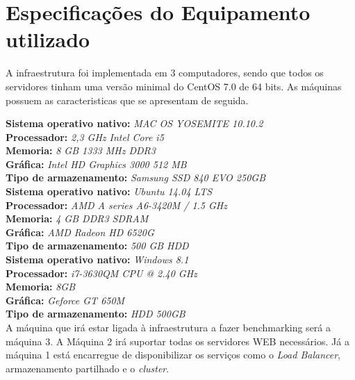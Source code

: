 \section{Especificações do Equipamento utilizado}

A infraestrutura foi implementada em 3 computadores, sendo que todos os servidores tinham uma versão minimal do CentOS 7.0 de 64 bits. As máquinas possuem as caracteristicas que se apresentam de seguida.

\textbf{Sistema operativo nativo:} \textit{MAC OS YOSEMITE 10.10.2} \\
\textbf{Processador:} \textit{2,3 GHz Intel Core i5} \\
\textbf{Memoria:} \textit{8 GB 1333 MHz DDR3} \\
\textbf{Gráfica:} \textit{Intel HD Graphics 3000 512 MB} \\
\textbf{Tipo de armazenamento:} \textit{Samsung SSD 840 EVO 250GB} \\

\textbf{Sistema operativo nativo:} \textit{Ubuntu 14.04 LTS} \\
\textbf{Processador:} \textit{AMD A series A6-3420M / 1.5 GHz} \\
\textbf{Memoria:} \textit{4 GB DDR3 SDRAM} \\
\textbf{Gráfica:} \textit{AMD Radeon HD 6520G} \\
\textbf{Tipo de armazenamento:} \textit{ 500 GB HDD} \\

\textbf{Sistema operativo nativo:} \textit{Windows 8.1} \\
\textbf{Processador:} \textit{i7-3630QM CPU @ 2.40 GHz} \\
\textbf{Memoria:} \textit{8GB} \\
\textbf{Gráfica:} \textit{Geforce GT 650M} \\
\textbf{Tipo de armazenamento:} \textit{HDD 500GB} \\

A máquina que irá estar ligada à infraestrutura a fazer benchmarking será a máquina 3. A Máquina 2 irá suportar todas os servidores WEB necessários. Já a máquina 1 está encarregue de disponibilizar os serviços como o \textit{Load Balancer}, armazenamento partilhado e o \textit{cluster}.

